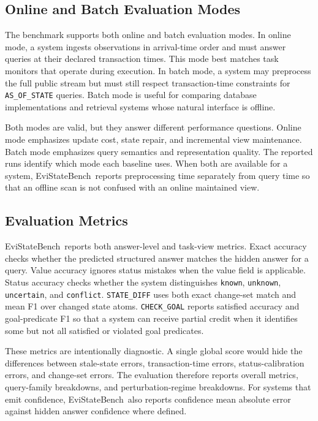 \documentclass[conference]{IEEEtran}
\newcommand{\bench}{EviStateBench}
\begin{document}
\subsection{Online and Batch Evaluation Modes}

The benchmark supports both online and batch evaluation modes. In online mode, a system ingests observations in arrival-time order and must answer queries at their declared transaction times. This mode best matches task monitors that operate during execution. In batch mode, a system may preprocess the full public stream but must still respect transaction-time constraints for \texttt{AS\_OF\_STATE} queries. Batch mode is useful for comparing database implementations and retrieval systems whose natural interface is offline.

Both modes are valid, but they answer different performance questions. Online mode emphasizes update cost, state repair, and incremental view maintenance. Batch mode emphasizes query semantics and representation quality. The reported runs identify which mode each baseline uses. When both are available for a system, \bench\ reports preprocessing time separately from query time so that an offline scan is not confused with an online maintained view.

\subsection{Evaluation Metrics}

\bench\ reports both answer-level and task-view metrics. Exact accuracy checks whether the predicted structured answer matches the hidden answer for a query. Value accuracy ignores status mistakes when the value field is applicable. Status accuracy checks whether the system distinguishes \texttt{known}, \texttt{unknown}, \texttt{uncertain}, and \texttt{conflict}. \texttt{STATE\_DIFF} uses both exact change-set match and mean F1 over changed state atoms. \texttt{CHECK\_GOAL} reports satisfied accuracy and goal-predicate F1 so that a system can receive partial credit when it identifies some but not all satisfied or violated goal predicates.

These metrics are intentionally diagnostic. A single global score would hide the differences between stale-state errors, transaction-time errors, status-calibration errors, and change-set errors. The evaluation therefore reports overall metrics, query-family breakdowns, and perturbation-regime breakdowns. For systems that emit confidence, \bench\ also reports confidence mean absolute error against hidden answer confidence where defined.
\end{document}
